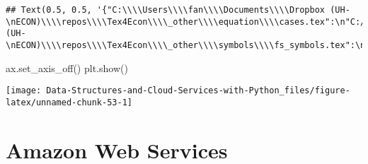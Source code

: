 \documentclass[
]{book}
\newenvironment{Shaded}{\begin{snugshade}}{\end{snugshade}}
\newcommand{\NormalTok}[1]{#1}
\begin{document}
\begin{verbatim}
## Text(0.5, 0.5, '{"C:\\\\Users\\\\fan\\\\Documents\\\\Dropbox (UH-\nECON)\\\\repos\\\\Tex4Econ\\\\_other\\\\equation\\\\cases.tex":\n"C:/Users/fan/Documents/cases.pdf",\n"C:\\\\Users\\\\fan\\\\Documents\\\\Dropbox (UH-\nECON)\\\\repos\\\\Tex4Econ\\\\_other\\\\symbols\\\\fs_symbols.tex":\n"C:/Users/fan/Documents/fs_symbols.pdf"}')
\end{verbatim}

\begin{Shaded}
\begin{Highlighting}[]
\NormalTok{ax.set_axis_off()}
\NormalTok{plt.show()}
\end{Highlighting}
\end{Shaded}

\begin{center}\texttt{[image: Data-Structures-and-Cloud-Services-with-Python\_files/figure-latex/unnamed-chunk-53-1]} \end{center}

\hypertarget{amazon-web-services}{%
\chapter{Amazon Web Services}\label{amazon-web-services}}
\end{document}
